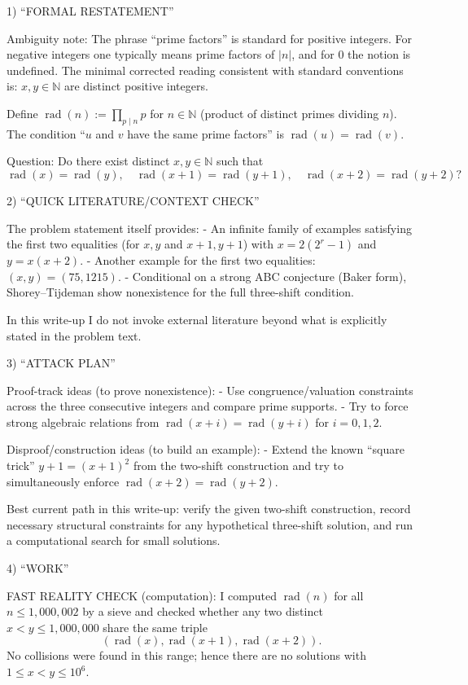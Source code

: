 1) “FORMAL RESTATEMENT”

Ambiguity note: The phrase “prime factors” is standard for positive integers. For negative integers one typically means prime factors of $|n|$, and for $0$ the notion is undefined. The minimal corrected reading consistent with standard conventions is: $x,y\in\mathbb{N}$ are distinct positive integers.

Define $\operatorname{rad}(n):=\prod_{p\mid n} p$ for $n\in\mathbb{N}$ (product of distinct primes dividing $n$). The condition “$u$ and $v$ have the same prime factors” is $\operatorname{rad}(u)=\operatorname{rad}(v)$.

Question: Do there exist distinct $x,y\in\mathbb{N}$ such that
\[
\operatorname{rad}(x)=\operatorname{rad}(y),\quad \operatorname{rad}(x+1)=\operatorname{rad}(y+1),\quad \operatorname{rad}(x+2)=\operatorname{rad}(y+2)?
\]

2) “QUICK LITERATURE/CONTEXT CHECK”

The problem statement itself provides:
- An infinite family of examples satisfying the first two equalities (for $x,y$ and $x+1,y+1$) with $x=2(2^r-1)$ and $y=x(x+2)$.
- Another example for the first two equalities: $(x,y)=(75,1215)$.
- Conditional on a strong ABC conjecture (Baker form), Shorey--Tijdeman show nonexistence for the full three-shift condition.

In this write-up I do not invoke external literature beyond what is explicitly stated in the problem text.

3) “ATTACK PLAN”

Proof-track ideas (to prove nonexistence):
- Use congruence/valuation constraints across the three consecutive integers and compare prime supports.
- Try to force strong algebraic relations from $\operatorname{rad}(x+i)=\operatorname{rad}(y+i)$ for $i=0,1,2$.

Disproof/construction ideas (to build an example):
- Extend the known “square trick” $y+1=(x+1)^2$ from the two-shift construction and try to simultaneously enforce $\operatorname{rad}(x+2)=\operatorname{rad}(y+2)$.

Best current path in this write-up: verify the given two-shift construction, record necessary structural constraints for any hypothetical three-shift solution, and run a computational search for small solutions.

4) “WORK”

FAST REALITY CHECK (computation):
I computed $\operatorname{rad}(n)$ for all $n\le 1{,}000{,}002$ by a sieve and checked whether any two distinct $x<y\le 1{,}000{,}000$ share the same triple
\[
(\operatorname{rad}(x),\operatorname{rad}(x+1),\operatorname{rad}(x+2)).
\]
No collisions were found in this range; hence there are no solutions with $1\le x<y\le 10^6$.

